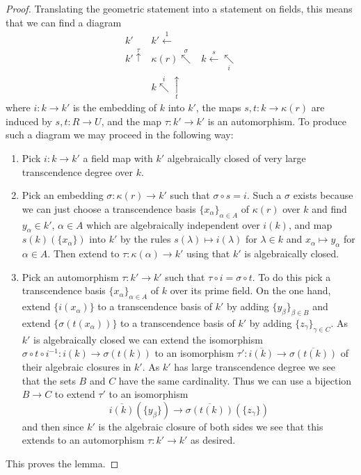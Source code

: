\begin{proof}
Translating the geometric statement into a statement on fields,
this means that we can find a diagram
$$
\begin{array}{ccc}k' & k' \overset{1}{\longleftarrow} &  \\ k' \overset{\tau}{\uparrow} & \kappa(r) \overset{\sigma}{\nwarrow} & k \overset{s}{\longleftarrow}\underset{i}{\nwarrow} \\  & k \overset{i}{\nwarrow}\underset{t}{\uparrow} & \end{array}
$$
where $i : k \to k'$ is the embedding of $k$ into $k'$,
the maps $s, t : k \to \kappa(r)$ are induced by $s, t : R \to U$, and
the map $\tau : k' \to k'$ is an automorphism. To produce such
a diagram we may proceed in the following way:
\begin{enumerate}
\item Pick $i : k \to k'$ a field map with $k'$ algebraically closed of
very large transcendence degree over $k$.
\item Pick an embedding $\sigma : \kappa(r) \to k'$ such that
$\sigma \circ s = i$. Such a $\sigma$ exists because we can just
choose a transcendence basis $\{x_\alpha\}_{\alpha \in A}$ of $\kappa(r)$
over $k$ and find $y_\alpha \in k'$, $\alpha \in A$ which are algebraically
independent over $i(k)$, and map $s(k)(\{x_\alpha\})$ into $k'$ by
the rules $s(\lambda) \mapsto i(\lambda)$ for $\lambda \in k$
and $x_\alpha \mapsto y_\alpha$ for $\alpha \in A$.
Then extend to $\tau : \kappa(\alpha) \to k'$ using that $k'$ is
algebraically closed.
\item Pick an automorphism $\tau : k' \to k'$ such that
$\tau \circ i = \sigma \circ t$. To do this pick a transcendence
basis $\{x_\alpha\}_{\alpha \in A}$ of $k$ over its prime field.
On the one hand, extend $\{i(x_\alpha)\}$ to a transcendence basis of
$k'$ by adding $\{y_\beta\}_{\beta \in B}$ and extend
$\{\sigma(t(x_\alpha))\}$ to a transcendence basis of $k'$ by adding
$\{z_\gamma\}_{\gamma \in C}$.
As $k'$ is algebraically closed we can extend the isomorphism
$\sigma \circ t \circ i^{-1} : i(k) \to \sigma(t(k))$
to an isomorphism $\tau' : \overline{i(k)} \to \overline{\sigma(t(k))}$
of their algebraic closures in $k'$.
As $k'$ has large transcendence degree
we see that the sets $B$ and $C$ have the same cardinality.
Thus we can use a bijection
$B \to C$ to extend $\tau'$ to an isomorphism
$$
\overline{i(k)}(\{y_\beta\})
\longrightarrow
\overline{\sigma(t(k))}(\{z_\gamma\})
$$
and then since $k'$ is the algebraic closure of both sides we
see that this extends to an automorphism $\tau : k' \to k'$
as desired.
\end{enumerate}
This proves the lemma.
\end{proof}

